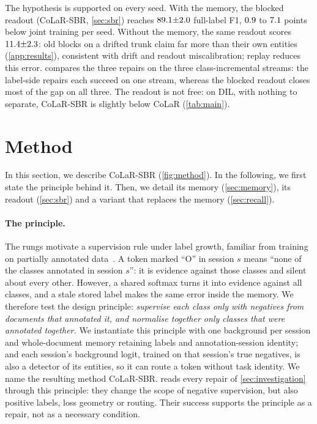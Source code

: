 \documentclass[10pt,twocolumn,letterpaper]{article}
\begin{document}
The hypothesis is supported on every seed. With the memory, the blocked readout (CoLaR-SBR, \cref{sec:sbr}) reaches $89.1{\pm}2.0$ full-label F1, $0.9$ to $7.1$ points below joint training per seed. Without the memory, the same readout scores $11.4{\pm}2.3$: old blocks on a drifted trunk claim far more than their own entities (\cref{app:results}), consistent with drift and readout miscalibration; replay reduces this error.  compares the three repairs on the three class-incremental streams: the label-side repairs each succeed on one stream, whereas the blocked readout closes most of the gap on all three. The readout is not free: on DIL, with nothing to separate, CoLaR-SBR is slightly below CoLaR (\cref{tab:main}).

\section{Method}
\label{sec:design}
In this section, we describe CoLaR-SBR (\cref{fig:method}). In the following, we first state the principle behind it. Then, we detail its memory (\cref{sec:memory}), its readout (\cref{sec:sbr}) and a variant that replaces the memory (\cref{sec:recall}).

\paragraph{The principle.} The rungs motivate a supervision rule under label growth, familiar from training on partially annotated data~\citep{greenberg2018marginal}. A token marked ``O'' in session $s$ means ``none of the classes annotated in session $s$'': it is evidence against those classes and silent about every other. However, a shared softmax turns it into evidence against all classes, and a stale stored label makes the same error inside the memory. We therefore test the design principle: \emph{supervise each class only with negatives from documents that annotated it, and normalise together only classes that were annotated together.} We instantiate this principle with one background per session and whole-document memory retaining labels and annotation-session identity; and each session's background logit, trained on that session's true negatives, is also a detector of its entities, so it can route a token without task identity. We name the resulting method CoLaR-SBR.  reads every repair of \cref{sec:investigation} through this principle: they change the scope of negative supervision, but also positive labels, loss geometry or routing. Their success supports the principle as a repair, not as a necessary condition.
\end{document}
